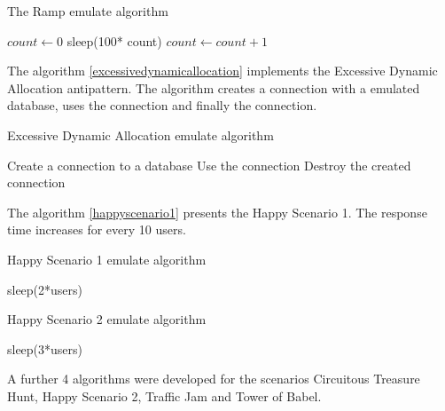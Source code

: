 \begin{algorithm}[H]
  \caption{The Ramp emulate algorithm}\label{rampalgorithm}
  \begin{algorithmic}[1]
    \State $count \gets 0  $
    \EndIf
    \State sleep(100* count)
    \State $count \gets count +1  $     
  \end{algorithmic}
\end{algorithm}


The algorithm \ref{excessivedynamicallocation} implements the Excessive Dynamic Allocation antipattern. The algorithm creates a connection with a emulated database, uses the connection and finally the connection.

\begin{algorithm}[H]
  \caption{Excessive Dynamic Allocation emulate algorithm}\label{excessivedynamicallocation}
  \begin{algorithmic}[1]
    
        \State Create a connection to a database
        \State Use the connection
        \State Destroy the created connection     
        \EndFor
    \EndFor
      
  \end{algorithmic}
\end{algorithm}

The algorithm \ref{happyscenario1} presents the Happy Scenario 1. The response time increases for every 10 users.

\begin{algorithm}[H]
  \caption{Happy Scenario 1 emulate algorithm}\label{happyscenario1}
  \begin{algorithmic}[1]
    \State sleep(2*users)   
  \end{algorithmic}
\end{algorithm}

\begin{algorithm}[H]
  \caption{Happy Scenario 2 emulate algorithm}\label{happyscenario2}
  \begin{algorithmic}[1]
    \State sleep(3*users)   
  \end{algorithmic}
\end{algorithm}

A further 4 algorithms were developed for the scenarios  Circuitous Treasure Hunt, Happy Scenario 2, Traffic Jam and Tower of Babel.

